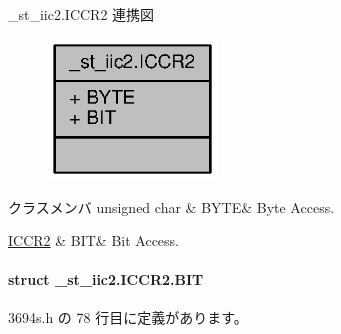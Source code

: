\+\_\+st\+\_\+iic2.\+I\+C\+C\+R2 連携図
\nopagebreak
\begin{figure}[H]
\begin{center}
\leavevmode
\includegraphics[width=127pt]{df/d17/union__st__iic2_8ICCR2__coll__graph}
\end{center}
\end{figure}
\begin{DoxyFields}{クラスメンバ}
unsigned char\label{3694s_8h_ae409eb2ba6eb6801f52763ae370c350e}
&
B\+Y\+T\+E&
Byte Access. \\
\hline

\hyperlink{3694s_8h_d9/da3/struct__st__iic2_8ICCR2_8BIT}{I\+C\+C\+R2}\label{3694s_8h_adb957fdc8000e1eef04a243f5199aa52}
&
B\+I\+T&
Bit Access. \\
\hline

\end{DoxyFields}
\label{struct__st__iic2_8ICCR2_8BIT}
\paragraph{struct \+\_\+st\+\_\+iic2.\+I\+C\+C\+R2.\+B\+I\+T}


 3694s.\+h の 78 行目に定義があります。



